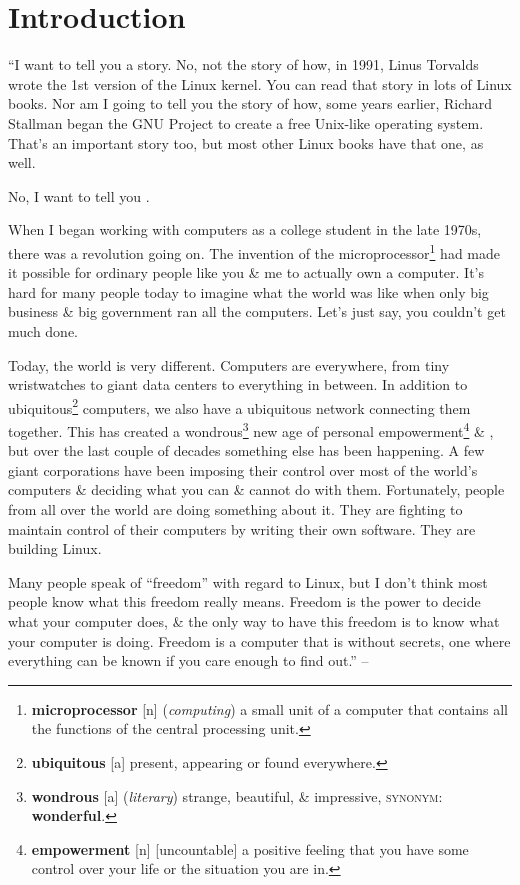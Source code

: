 \documentclass[oneside]{book}
\numberwithin{equation}{section}
\begin{document}

\section*{Introduction}
``I want to tell you a story. No, not the story of how, in 1991, Linus Torvalds wrote the 1st version of the Linux kernel. You can read that story in lots of Linux books. Nor am I going to tell you the story of how, some years earlier, Richard Stallman began the GNU Project to create a free Unix-like operating system. That's an important story too, but most other Linux books have that one, as well.

No, I want to tell you .

When I began working with computers as a college student in the late 1970s, there was a revolution going on. The invention of the microprocessor\footnote{\textbf{microprocessor} [n] (\textit{computing}) a small unit of a computer that contains all the functions of the central processing unit.} had made it possible for ordinary people like you \& me to actually own a computer. It's hard for many people today to imagine what the world was like when only big business \& big government ran all the computers. Let's just say, you couldn't get much done.

Today, the world is very different. Computers are everywhere, from tiny wristwatches to giant data centers to everything in between. In addition to ubiquitous\footnote{\textbf{ubiquitous} [a] present, appearing or found everywhere.} computers, we also have a ubiquitous network connecting them together. This has created a wondrous\footnote{\textbf{wondrous} [a] (\textit{literary}) strange, beautiful, \& impressive, \textsc{synonym}: \textbf{wonderful}.} new age of personal empowerment\footnote{\textbf{empowerment} [n] [uncountable] a positive feeling that you have some control over your life or the situation you are in.} \& , but over the last couple of decades something else has been happening. A few giant corporations have been imposing their control over most of the world's computers \& deciding what you can \& cannot do with them. Fortunately, people from all over the world are doing something about it. They are fighting to maintain control of their computers by writing their own software. They are building Linux.

Many people speak of ``freedom'' with regard to Linux, but I don't think most people know what this freedom really means. Freedom is the power to decide what your computer does, \& the only way to have this freedom is to know what your computer is doing. Freedom is a computer that is without secrets, one where everything can be known if you care enough to find out.'' -- \cite[pp. 30--31]{Shotts2019}
\end{document}
